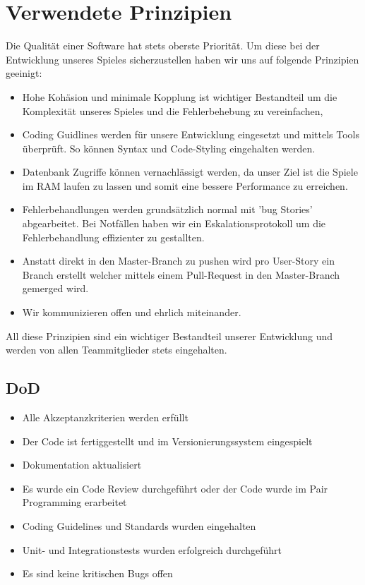 \documentclass[a4paper, 11pt]{scrartcl}
\let\oldsection\section
\renewcommand\section{\clearpage\oldsection}
\begin{document}
\section{Verwendete Prinzipien}
Die Qualität einer Software hat stets oberste Priorität. Um diese bei der Entwicklung unseres Spieles
sicherzustellen haben wir uns auf folgende Prinzipien geeinigt:
\begin{itemize}
\item Hohe Kohäsion und minimale Kopplung ist wichtiger Bestandteil um die Komplexität unseres
 Spieles und die Fehlerbehebung zu vereinfachen,
\item Coding Guidlines werden für unsere Entwicklung eingesetzt und mittels Tools überprüft. So können Syntax und Code-Styling eingehalten werden.
\item Datenbank Zugriffe können vernachlässigt werden, da unser Ziel ist die Spiele im RAM laufen zu lassen und somit eine bessere Performance zu erreichen.
\item Fehlerbehandlungen werden grundsätzlich normal mit 'bug Stories' abgearbeitet. Bei Notfällen haben wir ein Eskalationsprotokoll um die Fehlerbehandlung effizienter zu gestallten.
\item Anstatt direkt in den Master-Branch zu pushen wird pro User-Story ein Branch erstellt welcher mittels einem Pull-Request in den Master-Branch gemerged wird.
\item Wir kommunizieren offen und ehrlich miteinander. 
\end{itemize}
All diese Prinzipien sind ein wichtiger Bestandteil unserer Entwicklung und werden von allen Teammitglieder stets eingehalten.
\subsection{DoD}
\begin{itemize}
\item Alle Akzeptanzkriterien werden erfüllt
\item Der Code ist fertiggestellt und im Versionierungssystem eingespielt
\item Dokumentation aktualisiert
\item Es wurde ein Code Review durchgeführt oder der Code wurde im Pair Programming erarbeitet
\item Coding Guidelines und Standards wurden eingehalten
\item Unit- und Integrationstests wurden erfolgreich durchgeführt
\item Es sind keine kritischen Bugs offen
\end{itemize}
\end{document}
